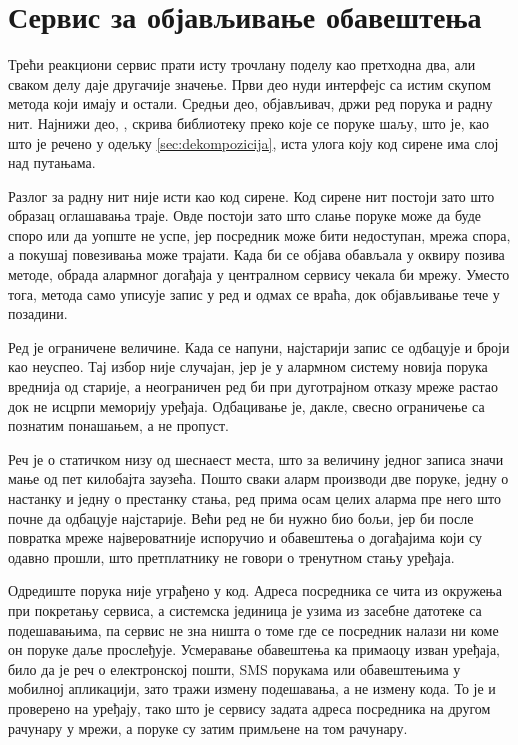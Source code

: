\documentclass[12pt,oneside]{memoir}
\begin{document}
\section{Сервис за објављивање обавештења}
\label{sec:impl-mqtt}

Трећи реакциони сервис прати исту трочлану поделу као претходна два, али сваком делу даје
другачије значење. Први део нуди  интерфејс са истим скупом метода који имају и
остали. Средњи део, објављивач, држи ред порука и радну нит. Најнижи део, ,
скрива библиотеку преко које се поруке шаљу, што је, као што је речено у одељку
\ref{sec:dekompozicija}, иста улога коју код сирене има слој над  путањама.

Разлог за радну нит није исти као код сирене. Код сирене нит постоји зато
што образац оглашавања траје. Овде постоји зато што слање поруке може да буде споро
или да уопште не успе, јер посредник може бити недоступан, мрежа спора, а покушај повезивања
може трајати. Када би се објава обављала у оквиру позива методе, обрада алармног догађаја у
централном сервису чекала би мрежу. Уместо тога, метода само уписује запис у ред и одмах се
враћа, док објављивање тече у позадини.

Ред је ограничене величине. Када се напуни, најстарији запис се одбацује и броји као
неуспео. Тај избор није случајан, јер је у алармном систему новија порука вреднија од старије,
а неограничен ред би при дуготрајном отказу мреже растао док не исцрпи меморију уређаја.
Одбацивање је, дакле, свесно ограничење са познатим понашањем, а не пропуст.

Реч је о статичком низу од шеснаест места, што за величину једног записа значи мање од пет
килобајта заузећа. Пошто сваки аларм производи две поруке, једну о настанку и једну о
престанку стања, ред прима осам целих аларма пре него што почне да одбацује најстарије. Већи ред не би нужно био бољи, јер би после повратка мреже
највероватније испоручио и обавештења о догађајима који су одавно прошли, што претплатнику не говори о
тренутном стању уређаја.

Одредиште порука није уграђено у код. Адреса посредника се чита из окружења при покретању
сервиса, а системска јединица је узима из засебне датотеке са подешавањима, па сервис не зна
ништа о томе где се посредник налази ни коме он поруке даље прослеђује. Усмеравање
обавештења ка примаоцу изван уређаја, било да је реч о електронској пошти, {\lat SMS}
порукама или обавештењима у мобилној апликацији, зато тражи измену подешавања, а не измену
кода. То
је и проверено на уређају, тако што је сервису задата адреса посредника на другом рачунару у
мрежи, а поруке су затим примљене на том рачунару.
\end{document}

